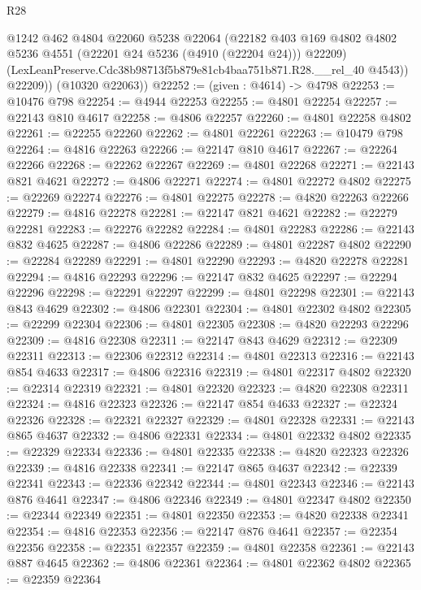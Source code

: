 \begin{lexlean}{R28}
\begin{coremodule}
            @1242
            @462
            @4804
            @22060
            @5238
            @22064
            (@22182
              @403
              @169
              @4802
              @4802
              @5236
              @4551
              (@22201 @24 @5236 (@4910 (@22204 @24)))
              @22209)
            (LexLeanPreserve.Cdc38b98713f5b879e81cb4baa751b871.R28.__rel_40 @4543))
          @22209))
      (@10320 @22063))
@22252 := (given : @4614) -> @4798
@22253 := @10476 @798
@22254 := @4944 @22253
@22255 := @4801 @22254
@22257 := @22143 @810 @4617
@22258 := @4806 @22257
@22260 := @4801 @22258 @4802
@22261 := @22255 @22260
@22262 := @4801 @22261
@22263 := @10479 @798
@22264 := @4816 @22263
@22266 := @22147 @810 @4617
@22267 := @22264 @22266
@22268 := @22262 @22267
@22269 := @4801 @22268
@22271 := @22143 @821 @4621
@22272 := @4806 @22271
@22274 := @4801 @22272 @4802
@22275 := @22269 @22274
@22276 := @4801 @22275
@22278 := @4820 @22263 @22266
@22279 := @4816 @22278
@22281 := @22147 @821 @4621
@22282 := @22279 @22281
@22283 := @22276 @22282
@22284 := @4801 @22283
@22286 := @22143 @832 @4625
@22287 := @4806 @22286
@22289 := @4801 @22287 @4802
@22290 := @22284 @22289
@22291 := @4801 @22290
@22293 := @4820 @22278 @22281
@22294 := @4816 @22293
@22296 := @22147 @832 @4625
@22297 := @22294 @22296
@22298 := @22291 @22297
@22299 := @4801 @22298
@22301 := @22143 @843 @4629
@22302 := @4806 @22301
@22304 := @4801 @22302 @4802
@22305 := @22299 @22304
@22306 := @4801 @22305
@22308 := @4820 @22293 @22296
@22309 := @4816 @22308
@22311 := @22147 @843 @4629
@22312 := @22309 @22311
@22313 := @22306 @22312
@22314 := @4801 @22313
@22316 := @22143 @854 @4633
@22317 := @4806 @22316
@22319 := @4801 @22317 @4802
@22320 := @22314 @22319
@22321 := @4801 @22320
@22323 := @4820 @22308 @22311
@22324 := @4816 @22323
@22326 := @22147 @854 @4633
@22327 := @22324 @22326
@22328 := @22321 @22327
@22329 := @4801 @22328
@22331 := @22143 @865 @4637
@22332 := @4806 @22331
@22334 := @4801 @22332 @4802
@22335 := @22329 @22334
@22336 := @4801 @22335
@22338 := @4820 @22323 @22326
@22339 := @4816 @22338
@22341 := @22147 @865 @4637
@22342 := @22339 @22341
@22343 := @22336 @22342
@22344 := @4801 @22343
@22346 := @22143 @876 @4641
@22347 := @4806 @22346
@22349 := @4801 @22347 @4802
@22350 := @22344 @22349
@22351 := @4801 @22350
@22353 := @4820 @22338 @22341
@22354 := @4816 @22353
@22356 := @22147 @876 @4641
@22357 := @22354 @22356
@22358 := @22351 @22357
@22359 := @4801 @22358
@22361 := @22143 @887 @4645
@22362 := @4806 @22361
@22364 := @4801 @22362 @4802
@22365 := @22359 @22364

\end{coremodule}
\end{lexlean}
